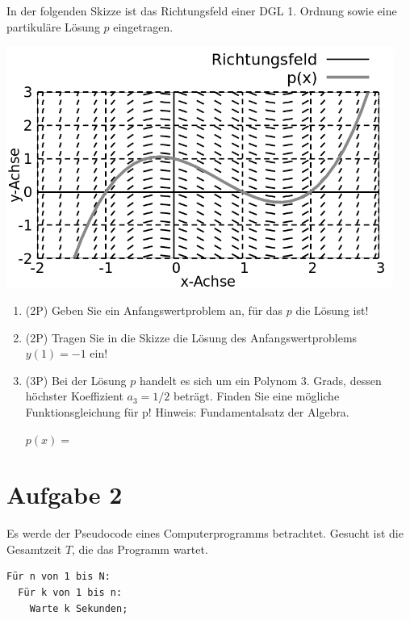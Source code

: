 \documentclass[12pt]{article}
\begin{document}
In der folgenden Skizze ist das Richtungsfeld einer DGL 1. Ordnung sowie eine partikuläre Lösung $p$ eingetragen.

\begin{center}
\includegraphics[width=0.95\textwidth]{grid.png}
\end{center}

\begin{enumerate}[label=(\alph*)]
\item (2P) Geben Sie ein Anfangswertproblem an, für das $p$ die Lösung ist!

\bigskip
\bigskip
\bigskip
\bigskip
\bigskip
\bigskip
\bigskip

\item (2P) Tragen Sie in die Skizze die Lösung des Anfangswertproblems $y(1) = -1$ ein!

\bigskip
\bigskip
\bigskip

\item (3P) Bei der Lösung $p$ handelt es sich um ein Polynom 3. Grads, dessen höchster Koeffizient $a_3=1/2$ beträgt. Finden Sie eine mögliche Funktionsgleichung für p! Hinweis: Fundamentalsatz der Algebra.

\bigskip
\bigskip
$p(x) = $

\end {enumerate}

\newpage
\section* {Aufgabe 2} Es werde der Pseudocode eines Computerprogramms betrachtet. Gesucht ist die Gesamtzeit $T$, die das Programm wartet.

\begin{verbatim}
Für n von 1 bis N:
  Für k von 1 bis n:
    Warte k Sekunden;
\end{verbatim}
\end{document}
